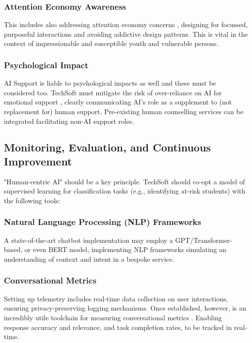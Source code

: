 \documentclass[14pt,a4paper]{article}
\begin{document}
\begin{multicols}{2}
\subsubsection{Attention Economy Awareness}
This includes also addressing attention economy concerns \textit{\parencite[pp. 10-30]{Williams2024}}, designing for focussed, purposeful interactions and avoiding addictive design patterns. This is vital in the context of impressionable and susceptible youth and vulnerable persons.

\subsubsection{Psychological Impact}
AI Support is liable to psychological impacts as well and these must be considered  too. TechSoft must mitigate the risk of over-reliance on AI for emotional support \textit{\parencite[p. 746]{Miner2022}}, clearly communicating AI's role as a supplement to (not replacement for) human support. Pre-existing human counselling services can be integrated facilitating non-AI support roles.

\subsection{Monitoring, Evaluation, and Continuous Improvement}
 "Human-centric AI" should be a key principle.
 TechSoft should co-opt a model of supervised learning for classification tasks (e.g., identifying at-risk students) with the following tools:

\subsubsection{Natural Language Processing (NLP) Frameworks}
A state-of-the-art chatbot implementation may employ a GPT/Transformer-based, or even BERT model, implementing NLP frameworks \textit{\parencite[pp. 1-15]{JurafskyMartin2024}} simulating an understanding of context and intent in a bespoke service.

\subsubsection{Conversational Metrics}
Setting up telemetry \textit{\parencite[pp. 30-60]{Vadapalli2023}} includes real-time data collection on user interactions, ensuring privacy-preserving logging mechanisms. Once established, however, is an incredibly utile toolchain for measuring conversational metrics \textit{\parencite[pp. 1-32]{Quarteroni2024}}.
Enabling response accuracy and relevance, and task completion rates, to be tracked in real-time.



\end{multicols}
\end{document}
